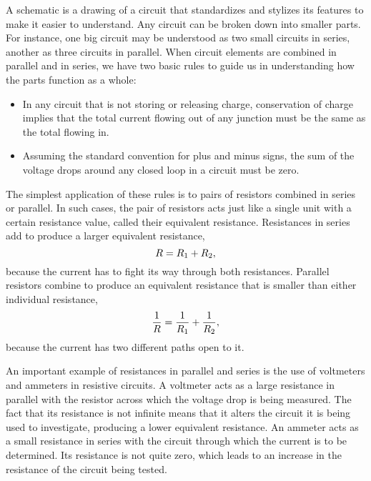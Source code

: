 	A schematic is a drawing of a circuit that standardizes and
	stylizes its features to make it easier to understand. Any
	circuit can be broken down into smaller parts. For instance,
	one big circuit may be understood as two small circuits in
	series, another as three circuits in parallel. When circuit
	elements are combined in parallel and in series, we have two
	basic rules to guide us in understanding how the parts
	function as a whole:
	
	\begin{itemize}
	\item[]  In any circuit that is not storing or
	releasing charge, conservation of charge implies that the
	total current flowing out of any junction must be the same
	as the total flowing in.
	
	\item[]  Assuming the standard convention for plus and
	minus signs, the sum of the voltage drops around any closed
	loop in a circuit must be zero.
	\end{itemize}
	
	The simplest application of these rules is to pairs of
	resistors combined in series or parallel. In such cases, the
	pair of resistors acts just like a single unit with a
	certain resistance value, called their equivalent resistance.
	Resistances in series add to produce a larger equivalent resistance, 
	\begin{equation*}
		R = R_1+R_2,
	\end{equation*}
	because the current has to fight its way through both
	resistances. Parallel resistors combine to produce an
	equivalent resistance that is smaller than either individual resistance,
	\begin{equation*}
		\frac{1}{R} = \frac{1}{R_1} + \frac{1}{R_2},
	\end{equation*}
	because the current has two different paths open to it.
	
	An important example of resistances in parallel and series
	is the use of voltmeters and ammeters in resistive circuits.
	A voltmeter acts as a large resistance in parallel with the
	resistor across which the voltage drop is being measured.
	The fact that its resistance is not infinite means that it
	alters the circuit it is being used to investigate,
	producing a lower equivalent resistance. An ammeter acts as
	a small resistance in series with the circuit through which
	the current is to be determined. Its resistance is not quite
	zero, which leads to an increase in the resistance of the
	circuit being tested.

